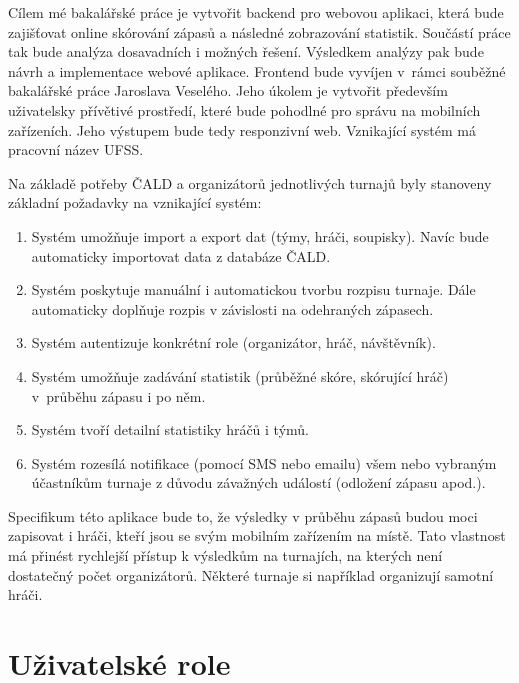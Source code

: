 \documentclass[thesis=B,czech]{FITthesis}[2012/06/26]
\begin{document}
\indent

Cílem mé bakalářské práce je vytvořit backend pro webovou aplikaci, která bude zajišťovat online skórování zápasů a následné zobrazování statistik.
Sou\-částí práce tak bude analýza dosavadních i možných řešení. Výsledkem analýzy pak bude návrh a implementace webové aplikace. 
Frontend bude vyvíjen v~rámci souběžné bakalářské práce Jaroslava Veselého.
Jeho úkolem je vytvořit především uživatelsky přívětivé prostředí, které bude pohodlné pro správu na mobilních zařízeních. Jeho výstupem bude tedy responzivní web.
Vznikající systém má pracovní název UFSS.

\medskip

Na základě potřeby ČALD a organizátorů jednotlivých turnajů byly stanoveny základní požadavky na vznikající systém:

\begin{enumerate}
\item Systém umožňuje import a export dat (týmy, hráči, soupisky). Navíc bude automaticky importovat data z databáze ČALD.
\item Systém poskytuje manuální i automatickou tvorbu rozpisu turnaje. Dále automaticky doplňuje rozpis v závislosti na odehraných zápasech.
\item Systém autentizuje konkrétní role (organizátor, hráč, návštěvník).
\item Systém umožňuje zadávání statistik (průběžné skóre, skórující hráč) v~prů\-běhu zápasu i po něm.
\item Systém tvoří detailní statistiky hráčů i týmů.
\item Systém rozesílá notifikace (pomocí SMS nebo emailu) všem nebo vybraným účastníkům turnaje z důvodu závažných událostí (odložení zápasu apod.).
\end{enumerate}

\medskip

Specifikum této aplikace bude to, že výsledky v průběhu zápasů budou moci zapisovat i hráči, kteří jsou se svým mobilním zařízením na místě.
Tato vlastnost má přinést rychlejší přístup k výsledkům na turnajích, na kterých není dostatečný počet organizátorů.
Některé turnaje si například organizují samotní hráči.

\section{Uživatelské role}

\end{document}
